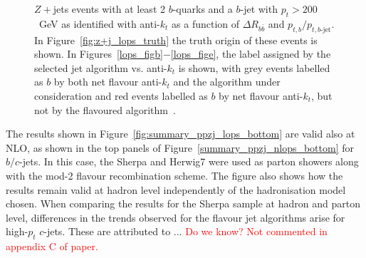 \documentclass[10pt,a4paper]{book}
\begin{document}
\begin{figure}
    \caption{$Z+$jets events with at least 2 $b$-quarks and a $b$-jet with $p_t > 200$~GeV as identified with anti-$k_t$ as a function of $\Delta R_{b\bar{b}}$ and
      $p_{t,b} / p_{t,b\text{-jet}}$. In Figure~\ref{fig:z+j_lops_truth} the truth origin of these events is shown. In Figures~\ref{lops_figb}$-$\ref{lops_fige}, the label assigned by the selected jet algorithm vs. anti-$k_t$ is shown, with grey events labelled as $b$ by
      both net flavour anti-$k_t$ and the algorithm under consideration and red events labelled as $b$ by net flavour anti-$k_t$, but not by the flavoured algorithm~\cite{Behring:2025ilo}.}
    \label{fig:lops_ppzjet_scatter_all}
\end{figure}

The results shown in Figure~\ref{fig:summary_ppzj_lops_bottom} are valid also at NLO, as shown in the top panels of Figure~\ref{summary_ppzj_nlops_bottom} for $b/c$-jets. In this case, the Sherpa and Herwig7 were used as parton showers along with the mod-2 flavour recombination scheme. The figure also shows how the results remain valid at hadron level independently of the hadronisation model chosen. When comparing the results for the Sherpa sample at hadron and parton level, differences in the trends observed for the flavour jet algorithms arise for high-$p_t$ $c$-jets. These are attributed to ... \textcolor{red}{Do we know? Not commented in appendix C of paper.}
\end{document}
